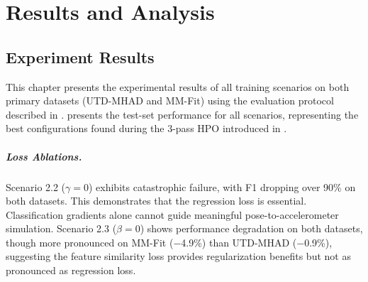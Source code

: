 \chapter{Results and Analysis}
\label{chap:results}
{\renewcommand{\thefootnote}{}}

\section{Experiment Results}

This chapter presents the experimental results of all training scenarios on both primary datasets (UTD-MHAD\cite{chen2015utd} and MM-Fit\cite{stromback2020mm}) using the evaluation protocol described in .  presents the test-set performance for all scenarios, representing the best configurations found during the 3-pass HPO introduced in .

\paragraph{Loss Ablations.}
Scenario 2.2 ($\gamma=0$) exhibits catastrophic failure, with F1 dropping over 90\% on both datasets. This demonstrates that the regression loss is essential. Classification gradients alone cannot guide meaningful pose-to-accelerometer simulation. Scenario 2.3 ($\beta=0$) shows performance degradation on both datasets, though more pronounced on MM-Fit ($-$4.9\%) than UTD-MHAD ($-$0.9\%), suggesting the feature similarity loss provides regularization benefits but not as pronounced as regression loss.

